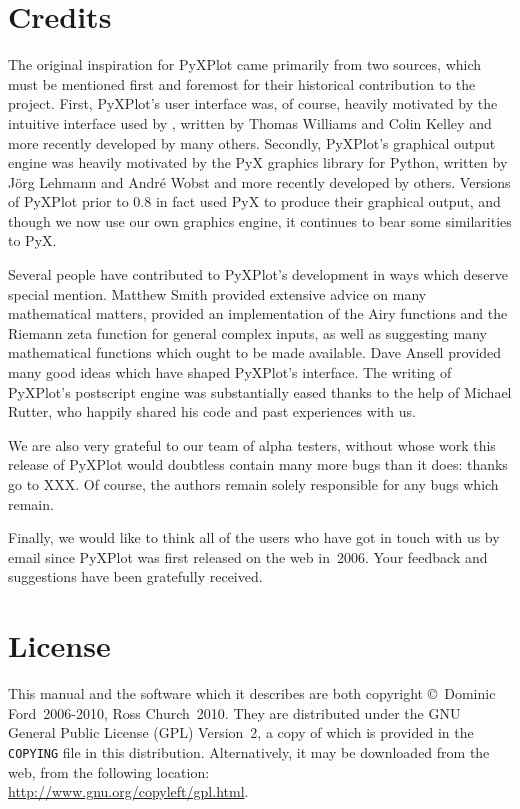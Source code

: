 \section{Credits}

The original inspiration for PyXPlot came primarily from two sources, which
must be mentioned first and foremost for their historical contribution to the
project. First, PyXPlot's user interface was, of course, heavily motivated by
the intuitive interface used by \gnuplot, written by Thomas Williams and Colin
Kelley and more recently developed by many others. Secondly, PyXPlot's
graphical output engine was heavily motivated by the PyX graphics
library for Python, written by J\"org Lehmann and Andr\'e Wobst and more
recently developed by others. Versions of PyXPlot prior to 0.8 in fact used PyX
to produce their graphical output, and though we now use our own graphics
engine, it continues to bear some similarities to PyX.

Several people have contributed to PyXPlot's development in ways which deserve
special mention.  Matthew Smith provided extensive advice on many mathematical
matters, provided an implementation of the Airy functions and the Riemann zeta
function for general complex inputs, as well as suggesting many mathematical
functions which ought to be made available. Dave Ansell provided many good
ideas which have shaped PyXPlot's interface. The writing of PyXPlot's
postscript engine was substantially eased thanks to the help of Michael Rutter,
who happily shared his code and past experiences with us.

We are also very grateful to our team of alpha testers, without whose work this
release of PyXPlot would doubtless contain many more bugs than it does: thanks
go to XXX. Of course, the authors remain solely responsible for any bugs which
remain.

Finally, we would like to think all of the users who have got in touch with us
by email since PyXPlot was first released on the web in~2006. Your feedback and
suggestions have been gratefully received.

\section{License}

This manual and the software which it describes are both copyright \copyright\
Dominic Ford~2006-2010, Ross Church~2010. They are distributed under the GNU
General Public License (GPL) Version~2, a copy of which is provided in the {\tt
COPYING} file in this distribution. Alternatively, it may be downloaded from the web, from
the following location:\\ \url{http://www.gnu.org/copyleft/gpl.html}.

